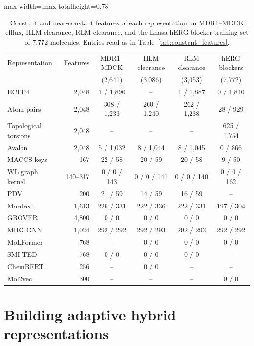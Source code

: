 \begin{table}[htbp]
\centering
\small
\setlength{\tabcolsep}{4pt}
\begin{adjustbox}{max width=\textwidth,max totalheight=0.78\textheight}
\begin{tabular}{lrcccc}
\toprule
Representation & Features & MDR1--MDCK & HLM clearance & RLM clearance & hERG blockers \\
 & & (2,641) & (3,086) & (3,053) & (7,772) \\
\midrule
ECFP4 & 2,048 & 1 / 1,890 & -- & 1 / 1,887 & 0 / 1,840 \\
Atom pairs & 2,048 & 308 / 1,233 & 260 / 1,240 & 262 / 1,238 & 28 / 929 \\
Topological torsions & 2,048 & -- & -- & -- & 625 / 1,754 \\
Avalon & 2,048 & 5 / 1,032 & 8 / 1,044 & 8 / 1,045 & 0 / 866 \\
MACCS keys & 167 & 22 / 58 & 20 / 59 & 20 / 58 & 9 / 50 \\
WL graph kernel & 140--317 & 0 / 0 / 143 & 0 / 0 / 141 & 0 / 0 / 140 & 0 / 0 / 162 \\
PDV & 200 & 21 / 59 & 14 / 59 & 16 / 59 & -- \\
Mordred & 1,613 & 226 / 331 & 222 / 336 & 222 / 331 & 197 / 304 \\
GROVER & 4,800 & 0 / 0 & 0 / 0 & 0 / 0 & 0 / 0 \\
MHG-GNN & 1,024 & 292 / 292 & 292 / 293 & 292 / 293 & 292 / 292 \\
MoLFormer & 768 & -- & 0 / 0 & 0 / 0 & 0 / 0 \\
SMI-TED & 768 & 0 / 0 & 0 / 0 & 0 / 0 & -- \\
ChemBERT & 256 & -- & 0 / 0 & -- & -- \\
Mol2vec & 300 & -- & -- & -- & 0 / 0 \\
\bottomrule
\end{tabular}
\end{adjustbox}
\caption[Constant and near-constant features per representation, part 2.]{Constant and near-constant features of each representation on MDR1--MDCK efflux, HLM clearance, RLM clearance, and the Lhasa hERG blocker training set of 7,772 molecules. Entries read as in Table~\ref{tab:constant_features}.}
\label{tab:constant_features_b}
\end{table}

\section{Building adaptive hybrid representations}\label{app:add:method}\label{app:searchspace}

